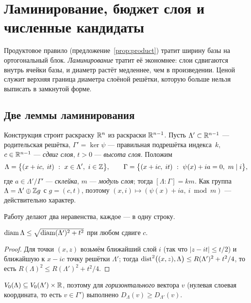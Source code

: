 \section{Ламинирование, бюджет слоя и численные кандидаты}
\label{sec:lam}

Продуктовое правило (предложение~\ref{prop:product}) тратит ширину базы на
ортогональный блок. \emph{Ламинирование} тратит её экономнее: слои сдвигаются
внутрь ячейки базы, и диаметр растёт медленнее, чем в произведении. Ценой
служит верхняя граница диаметра слоёной решётки, которую больше нельзя
выписать в замкнутой форме.

\subsection{Две леммы ламинирования}\label{ssec:lam}

Конструкция строит раскраску $\mathbb{R}^n$ из раскраски $\mathbb{R}^{n-1}$. Пусть
$\Lambda'\subset\mathbb{R}^{n-1}$ --- родительская решётка, $\Gamma'=\ker\psi$ ---
правильная подрешётка индекса~$k$, $c\in\mathbb{R}^{n-1}$ --- \emph{сдвиг слоя},
$t>0$ --- \emph{высота слоя}. Положим
\[
\Lambda=\bigl\{(x+ic,\;it)\ :\ x\in\Lambda',\ i\in\Z\bigr\},\qquad
\Gamma=\bigl\{(x+ic,\;it)\ :\ \psi(x)+ia=0,\ m\mid i\bigr\},
\]
где $a\in\Lambda'/\Gamma'$ --- \emph{склейка}, $m$ --- \emph{модуль слоя};
тогда $[\Lambda:\Gamma]=km$. Как группа $\Lambda=\Lambda'\oplus\mathbb{Z} g$ с
$g=(c,t)$, поэтому $(x,i)\mapsto(\psi(x)+ia,\ i\bmod m)$ --- действительно
характер.

Работу делают два неравенства, каждое --- в одну строку.

\begin{lemma}\label{lem:P1}
$\operatorname{diam}\Lambda\le\sqrt{\operatorname{diam}(\Lambda')^2+t^2}$ при любом сдвиге $c$.
\end{lemma}

\begin{proof}
Для точки $(x,z)$ возьмём ближайший слой $i$ (так что $|z-it|\le t/2$) и
ближайшую к $x-ic$ точку решётки $\Lambda'$; тогда
$\operatorname{dist}^2\bigl((x,z),\Lambda\bigr)\le R(\Lambda')^2+t^2/4$, то есть
$R(\Lambda)^2\le R(\Lambda')^2+t^2/4$.
\end{proof}

\begin{lemma}\label{lem:P2}
$V_0(\Lambda)\subseteq V_0(\Lambda')\times\mathbb{R}$, поэтому для
\emph{горизонтального} вектора $v$ (нулевая слоевая координата, то есть
$v\in\Gamma'$) выполнено $D_\Lambda(v)\ge D_{\Lambda'}(v)$.
\end{lemma}

